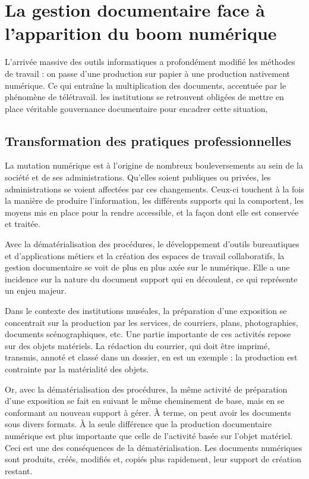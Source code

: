 \section{La gestion documentaire face à l’apparition du boom numérique}

L'arrivée massive des outils informatiques a profondément modifié les méthodes de travail : on passe d'une production sur papier à une production nativement numérique. Ce qui entraîne la multiplication des documents, accentuée par le phénomène de télétravail. les institutions se retrouvent obligées de mettre en place véritable gouvernance documentaire pour encadrer cette situation, 

\subsection*{Transformation des pratiques professionnelles}

La mutation numérique est à l’origine de nombreux bouleversements au sein de la société et de ses administrations. Qu’elles soient publiques ou privées, les administrations se voient affectées par ces changements. Ceux-ci touchent à la fois la manière de produire  l’information, les différents supports qui la comportent, les moyens mis en place pour la rendre accessible, et la façon dont elle est conservée et traitée. 

Avec la dématérialisation des procédures, le développement d’outils bureautiques et d’applications métiers et la création des espaces de travail collaboratifs, la gestion documentaire se voit de plus en plus axée sur le numérique. Elle a une incidence sur la nature du document support qui en découlent, ce qui représente un enjeu majeur.

Dans le contexte des institutions muséales, la préparation d’une exposition se concentrait sur la production par les services, de courriers, plans, photographies, documents scénographiques, etc. Une partie importante de ces activités repose sur des objets matériels. La rédaction du courrier, qui doit être imprimé, transmis, annoté et classé dans un dossier,  en est un exemple : la production est contrainte par la matérialité des objets.

Or, avec la dématérialisation des procédures, la même activité de préparation d’une exposition se fait en suivant le même cheminement de base, mais en se conformant au nouveau support à gérer. À terme, on peut avoir les documents sous divers formats. À la seule différence que la production documentaire numérique est plus importante que celle de l’activité basée sur l’objet matériel. Ceci est une des conséquences de la dématérialisation. Les documents numériques sont produits, créés, modifiés et, copiés plus rapidement, leur support de création restant.

